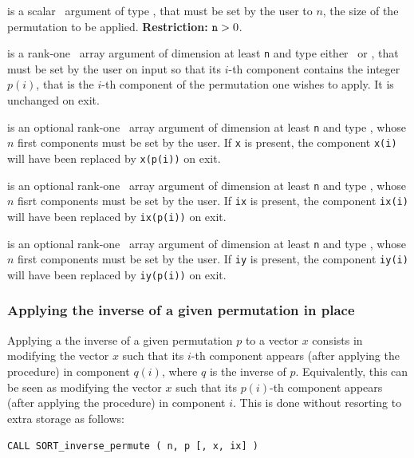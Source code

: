 \documentclass{galahad}
\newcommand{\packagename}{SORT}
\begin{document}
\begin{description}
 is a scalar \intentin\ argument of type
\integer, that must be set by the user to $n$, the size of the permutation to
be applied.
{\bf Restriction:} ${\tt n} > 0$.

 is a rank-one \intentinout\ array argument of
dimension at least {\tt n} and type either
\integer\ or \realdp, that must be set by the user
on input so that its $i$-th component contains the integer $p(i)$, that is the
$i$-th component of the permutation one wishes to apply.
It is unchanged on exit.

 is an optional rank-one \intentinout\ array argument of
dimension at least {\tt n} and type \realdp, whose $n$ first components must
be set by the user. If {\tt x} is present, the component {\tt x(i)} will have
been replaced by {\tt x(p(i))} on exit.

 is an optional rank-one \intentinout\ array argument of
dimension at least {\tt n} and type \integer, whose $n$ fisrt components must
be set by the user. If {\tt ix} is present, the component {\tt ix(i)} will have
been replaced by {\tt ix(p(i))} on exit.

 is an optional rank-one \intentinout\ array argument of
dimension at least {\tt n} and type \integer, whose $n$ first components must
be set by the user. If {\tt iy} is present, the component {\tt iy(i)} will have
been replaced by {\tt iy(p(i))} on exit.
\end{description}

\subsubsection{Applying the inverse of a given permutation in place}

Applying a the inverse of a given permutation $p$ to a vector $x$ consists in
modifying the vector $x$ such that its $i$-th component appears (after
applying the procedure) in component $q(i)$, where $q$ is the inverse of
$p$. Equivalently, this can be seen as modifying the vector $x$ such that its
$p(i)$-th component appears (after applying the procedure) in component $i$.
This is done without resorting to extra storage as follows:
\vspace*{1mm}

{\tt CALL \packagename\_inverse\_permute ( n, p [, x, ix] )}
\end{document}
